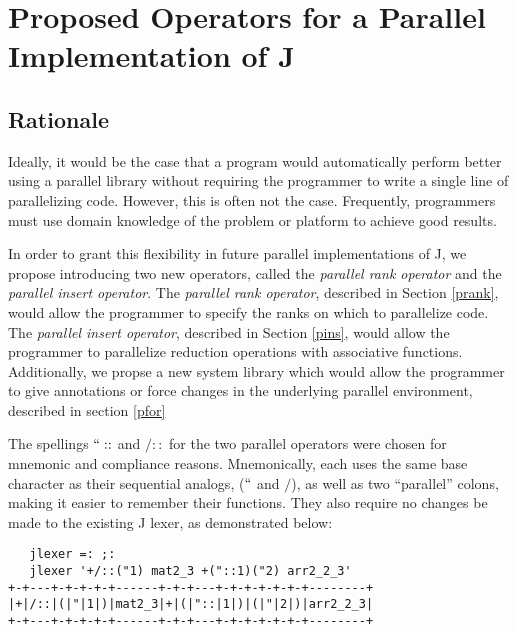 \chapter{Proposed Operators for a Parallel Implementation of J} %
\label{paraop}

\section{Rationale}
Ideally, it would be the case that a program would automatically perform better using a parallel library 
without requiring the programmer to write a single line of parallelizing code. 
However, this is often not the case. %
Frequently, programmers must use domain knowledge of the problem or platform to achieve good results. 

In order to grant this flexibility in future parallel implementations of J, 
we propose introducing two new operators, called the \textit{parallel rank operator} 
and the \textit{parallel insert operator}.
The \textit{parallel rank operator}, described in Section \ref{prank}, 
would allow the programmer to specify the ranks on which to parallelize code.
The \textit{parallel insert operator}, described in Section \ref{pins}, 
would allow the programmer to parallelize reduction operations with associative functions.
Additionally, we propse a new system library
which would allow the programmer to give annotations or force changes in the underlying parallel environment,
described in section \ref{pfor}

The spellings $``::$ and $/::$ for the two parallel operators were chosen for mnemonic and compliance reasons.
Mnemonically, each uses the same base character as their sequential analogs, ($``$ and $/$), 
as well as two ``parallel'' colons, making it easier to remember their functions.
They also require no changes be made to the existing J lexer\cite{ioj}, 
as demonstrated below:

\begin{singlespacing}
\begin{small}
\begin{verbatim}
   jlexer =: ;:
   jlexer '+/::("1) mat2_3 +("::1)("2) arr2_2_3'
+-+---+-+-+-+-+------+-+-+---+-+-+-+-+-+-+--------+
|+|/::|(|"|1|)|mat2_3|+|(|"::|1|)|(|"|2|)|arr2_2_3|
+-+---+-+-+-+-+------+-+-+---+-+-+-+-+-+-+--------+
\end{verbatim}
\end{small}
\end{singlespacing}

